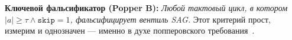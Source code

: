 \textbf{Ключевой фальсификатор (Popper B):}
\emph{Любой тактовый цикл, в котором $|a| \geq \tau \wedge \texttt{skip} = 1$,
фальсифицирует вентиль SAG.}  Этот критерий прост, измерим и однозначен —
именно в духе попперовского требования~\cite{popper1959}.

